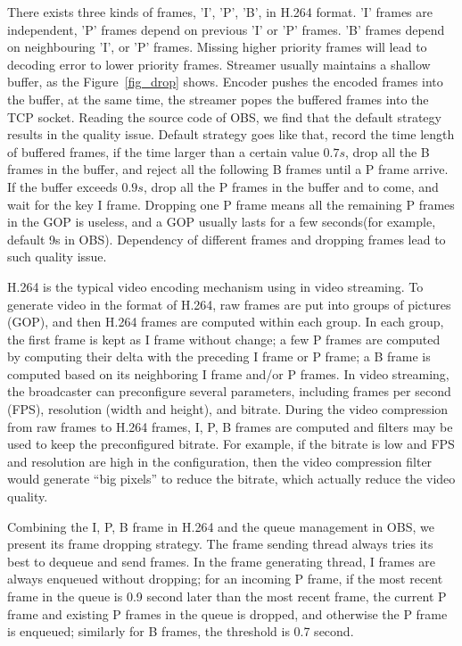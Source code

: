 There exists three kinds of frames, 'I', 'P', 'B', in H.264 format. 'I' frames are independent, 'P' frames depend on previous 'I' or 'P' frames. 'B' frames depend on neighbouring 'I', or 'P' frames. Missing higher priority frames will lead to decoding error to lower priority frames.
Streamer usually maintains a shallow buffer, as the Figure~\ref{fig_drop} shows. Encoder pushes the encoded frames into the buffer, at the same time, the streamer popes the buffered frames into the TCP socket. Reading the source code of OBS, we find that the default strategy results in the quality issue. Default strategy goes like that, record the time length of buffered frames, if the time larger than a certain value $0.7s$, drop all the B frames in the buffer, and reject all the following B frames until a P frame arrive. If the buffer exceeds $0.9s$, drop all the P frames in the buffer and to come, and wait for the key I frame. Dropping one P frame means all the remaining P frames in the GOP is useless, and a GOP usually lasts for a few seconds(for example, default 9s in OBS). Dependency of different frames and dropping frames lead to such quality issue.

H.264 is the typical video encoding mechanism using in video streaming. To generate video in the format of H.264, raw frames are put into groups of pictures (GOP), and then H.264 frames are computed within each group. In each group, the first frame is kept as I frame without change; a few P frames are computed by computing their delta with the preceding I frame or P frame; a B frame is computed based on its neighboring I frame and/or P frames. In video streaming, the broadcaster can preconfigure several parameters, including frames per second (FPS), resolution (width and height), and bitrate. During the video compression from raw frames to H.264 frames, I, P, B frames are computed and filters may be used to keep the preconfigured bitrate. For example, if the bitrate is low and FPS and resolution are high in the configuration, then the video compression filter would generate ``big pixels'' to reduce the bitrate, which actually reduce the video quality.

Combining the I, P, B frame in H.264 and the queue management in OBS, we present its frame dropping strategy. The frame sending thread always tries its best to dequeue and send frames. In the frame generating thread, I frames are always enqueued without dropping; for an incoming P frame, if the most recent frame in the queue is 0.9 second later than the most recent frame, the current P frame and existing P frames in the queue is dropped, and otherwise the P frame is enqueued; similarly for B frames, the threshold is 0.7 second.


